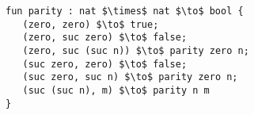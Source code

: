 \begin{lstlisting}
fun parity : nat $\times$ nat $\to$ bool {
   (zero, zero) $\to$ true;
   (zero, suc zero) $\to$ false;
   (zero, suc (suc n)) $\to$ parity zero n;
   (suc zero, zero) $\to$ false;
   (suc zero, suc n) $\to$ parity zero n;
   (suc (suc n), m) $\to$ parity n m
}
\end{lstlisting}
